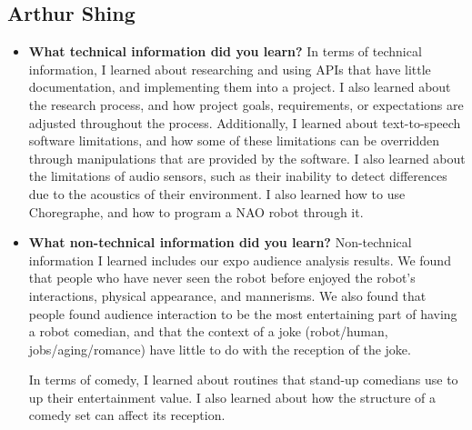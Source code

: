 \subsection{Arthur Shing}
\begin{itemize}
\item{\textbf{What technical information did you learn?}}
  In terms of technical information, I learned about researching and using APIs that have little documentation, and implementing them into a project. I also learned about the research process, and how project goals, requirements, or expectations are adjusted throughout the process.
  Additionally, I learned about text-to-speech software limitations, and how some of these limitations can be overridden through manipulations that are provided by the software.
  I also learned about the limitations of audio sensors, such as their inability to detect differences due to the acoustics of their environment. I also learned how to use Choregraphe, and how to program a NAO robot through it.
\item{\textbf{What non-technical information did you learn?}}
  Non-technical information I learned includes our expo audience analysis results. We found that people who have never seen the robot before enjoyed the robot's interactions, physical appearance, and mannerisms. We also found that people found audience interaction to be the most entertaining part of having a robot comedian, and that the context of a joke (robot/human, jobs/aging/romance) have little to do with the reception of the joke.

  In terms of comedy, I learned about routines that stand-up comedians use to up their entertainment value. I also learned about how the structure of a comedy set can affect its reception.


\end{itemize}
